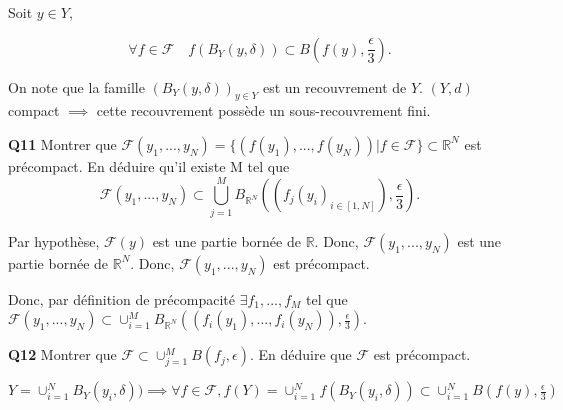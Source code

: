 \documentclass[french]{article}
\begin{document}
	Soit $y \in Y$,
	
	\[\forall f \in \mathcal{F} \quad f(B_Y(y, \delta)) \subset B\left(f(y), \frac{\epsilon}{3}\right).\]
	
	On note que la famille $(B_Y(y, \delta))_{y \in Y}$ est un recouvrement de $Y$. $(Y,d)$ compact $\implies$ cette recouvrement possède un sous-recouvrement fini.

	\begin{tcolorbox}[colback=gray!5!white,colframe=gray!75!black]
		\textbf{\large{Q11}} Montrer que $\mathcal{F}(y_1,...,y_N) = \{(f(y_1),...,f(y_N)) | f \in \mathcal{F}\} \subset \mathbb{R}^N$ est précompact. En déduire qu'il existe M tel que
		\[\mathcal{F}(y_1,...,y_N) \subset \bigcup_{j=1}^{M}B_{\mathbb{R}^N}\left((f_j(y_i)_{i\in[1,N]}), \frac{\epsilon}{3}\right).\]
	\end{tcolorbox}

	Par hypothèse, $\mathcal{F}(y)$ est une partie bornée de $\mathbb{R}$.
	Donc, $\mathcal{F}(y_1,...,y_N)$ est une partie bornée de $\mathbb{R}^N$.
	Donc, $\mathcal{F}(y_1,...,y_N)$ est précompact.
	
	Donc, par définition de précompacité $\exists f_1,...,f_M$ tel que $\mathcal{F}(y_1,...,y_N) \subset \cup_{i=1}^{M} B_{\mathbb{R}^N}\left( (f_i(y_1), ... , f_i(y_N)), \frac{\epsilon}{3}\right)$.

	\begin{tcolorbox}[colback=gray!5!white,colframe=gray!75!black]
		\textbf{\large{Q12}} Montrer que $\mathcal{F} \subset \cup_{j=1}^{M} B(f_j, \epsilon)$. En déduire que $\mathcal{F}$ est précompact.
	\end{tcolorbox}

	$ Y = \cup_{i=1}^{N} B_Y(y_i, \delta)) \implies \forall f \in \mathcal{F}, f(Y) = \cup_{i=1}^{N} f(B_Y(y_i, \delta)) \subset \cup_{i=1}^{N} B\left(f(y), \frac{\epsilon}{3}\right)$
	
\end{document}
